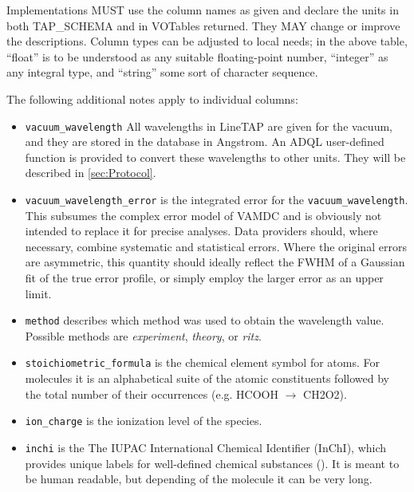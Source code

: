 \documentclass[11pt,a4paper]{ivoa}
\begin{document}
Implementations MUST use the column names as given and declare the units
in both TAP\_SCHEMA and in VOTables returned.  They MAY change or improve
the descriptions.  Column types can be adjusted to local needs; in the
above table, ``float'' is to be understood as any suitable
floating-point number, ``integer'' as any integral type, and ``string''
some sort of character sequence.

The following additional notes apply to individual columns:

\begin{itemize}
\item \texttt{vacuum\_wavelength}
All wavelengths in LineTAP are given for the vacuum,
and  they are stored in the database in
Angstrom.  An  ADQL user-defined function is provided to convert these
wavelengths to other units. They will be described in
\ref{sec:Protocol}.

\item \texttt{vacuum\_wavelength\_error} is the integrated error for the 
\texttt{vacuum\_wavelength}.  This subsumes the complex error model of
VAMDC and is obviously not intended to replace it for precise analyses.
Data providers should, where necessary, combine systematic and
statistical errors.  Where the original errors are asymmetric, this
quantity should ideally reflect the FWHM of a Gaussian fit of the true
error profile, or simply employ the larger error as an upper limit.

\item \texttt{method} describes which method was used to obtain the
wavelength value. Possible methods are \textit{experiment},  \textit{theory}, 
or \textit{ritz}.

\item \texttt{stoichiometric\_formula} is the chemical element symbol
for atoms. For molecules it is an alphabetical suite of the atomic
constituents followed by the total number of their occurrences (e.g.
HCOOH $\to$ CH2O2).

\item \texttt{ion\_charge} is the ionization level of the species.

\item \texttt{inchi} is the The IUPAC International Chemical Identifier
(InChI), which  provides unique labels for well-defined chemical
substances (\cite{INCHI}). It is meant to be human readable, but
depending of the molecule it can be very long.


\end{itemize}
\end{document}
